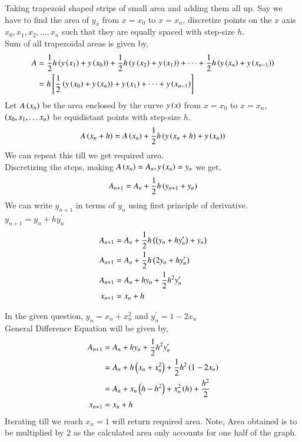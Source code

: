 \documentclass[journal]{IEEEtran}
\begin{document}
Taking trapezoid shaped strips of small area and adding them all up. Say we have to find the area of $y_{x}$ from $x=x_0$ to $x=x_n$, discretize points on the $x$ axis $x_0, x_1, x_2, \dots, x_n$ such that they are equally spaced with step-size $h$. \\
Sum of all trapezoidal areas is given by,
\begin{align}
  A&=\frac{1}{2}h\left(y\left(x_1\right)+y\left(x_0\right)\right)+ \frac{1}{2}h\left(y\left(x_2\right)+y\left(x_1\right)\right)+\dots+\frac{1}{2}h\left(y\left(x_n\right)+y\left(x_{n-1}\right)\right)\\
  &=h{}\left[\frac{1}{2}\left(y\left(x_0\right)+y\left(x_n\right)\right)+ y\left(x_1\right)+\dots+y\left(x_{n-1}\right)\right]
\end{align}
Let $A\left(x_n\right)$ be the area enclosed by the curve $y\left(x\right)$ from $x=x_0$ to $x=x_n$, $\left(x_0, x_1, \dots x_n\right)$ be equidistant points with step-size $h$.
\begin{align}
  A\left(x_n+h\right)=A\left(x_n\right)+\frac{1}{2}h\left(y\left(x_n+h\right)+y\left(x_n\right)\right)
\end{align}
We can repeat this till we get required area.\\
Discretizing the steps, making $A\left(x_n\right)=A_n, y\left(x_n\right)=y_n$ we get,
\begin{align}
 A_{n+1}=A_n+\frac{1}{2}h\left(y_{n+1}+y_n\right)
\end{align}
We can write $y_{n+1}$ in terms of $y_n$ using first principle of derivative. $y_{n+1}=y_n+hy^{\prime}_n$
\begin{align}
  A_{n+1}&=A_n+\frac{1}{2}h\left(\left(y_{n}+hy^{\prime}_n\right)+y_n\right)\\
  A_{n+1}&=A_n+\frac{1}{2}h\left(2y_n+hy^{\prime}_n\right)\\
  A_{n+1}&=A_n+hy_n+\frac{1}{2}h^2y^{\prime}_n\\
  x_{n+1}&=x_n+h
\end{align}

In the given question, $y_n=x_n+x_n^2$ and $y^{\prime}_n=1-2x_n$\\
General Difference Equation will be given by,
\begin{align}
  A_{n+1}&=A_n+hy_n+\frac{1}{2}h^2y^{\prime}_n\\
  &=A_n+h\left(x_n+x_n^2\right)+\frac{1}{2}h^2\left(1-2x_n\right)\\
  &=A_n+x_n\left(h-h^2\right)+x_n^2\left(h\right)+\frac{h^2}{2}\\
  x_{n+1}&=x_n+h
\end{align}
Iterating till we reach $x_n=1$ will return required area. Note, Area obtained is to be multiplied by $2$ as the calculated area only accounts for one half of the graph.\\
\end{document}
